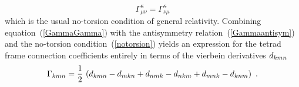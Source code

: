 \documentclass[twocolumn,showpacs,preprintnumbers,amsmath,amssymb,prb]{revtex4}
\begin{document}
\begin{equation}
\label{notorsion}
  \Gamma^\kappa_{\mu\nu} =
  \Gamma^\kappa_{\nu\mu}
\end{equation}
which is the usual no-torsion condition of general relativity.
Combining
equation~(\ref{GammaGamma})
with the antisymmetry relation~(\ref{Gammaantisym})
and the no-torsion condition~(\ref{notorsion})
yields an expression for the tetrad frame connection coefficients
entirely in terms of the vierbein derivatives
$d_{kmn}$
\begin{equation}
\label{gammaGamma}
  \Gamma_{kmn}
  =
  \frac{1}{2} \,
  \left(
  d_{kmn} - d_{mkn} + d_{nmk} - d_{nkm} + d_{mnk} - d_{knm}
  \right)
  \ .
\end{equation}
\end{document}

